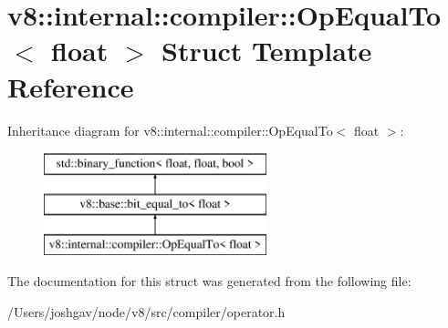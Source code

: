\hypertarget{structv8_1_1internal_1_1compiler_1_1_op_equal_to_3_01float_01_4}{}\section{v8\+:\+:internal\+:\+:compiler\+:\+:Op\+Equal\+To$<$ float $>$ Struct Template Reference}
\label{structv8_1_1internal_1_1compiler_1_1_op_equal_to_3_01float_01_4}
Inheritance diagram for v8\+:\+:internal\+:\+:compiler\+:\+:Op\+Equal\+To$<$ float $>$\+:\begin{figure}[H]
\begin{center}
\leavevmode
\includegraphics[height=3.000000cm]{structv8_1_1internal_1_1compiler_1_1_op_equal_to_3_01float_01_4}
\end{center}
\end{figure}


The documentation for this struct was generated from the following file\+:\begin{DoxyCompactItemize}
\item 
/\+Users/joshgav/node/v8/src/compiler/operator.\+h\end{DoxyCompactItemize}
